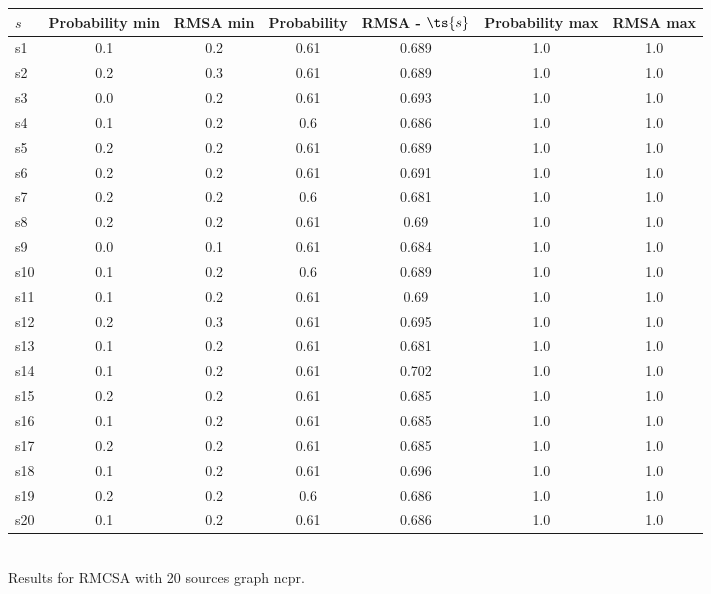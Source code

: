 \documentclass{article}
\begin{document}
\noindent\begin{tabular}{|l|c|c|c|c|c|c|}
\hline
$s$& Probability min & RMSA min & Probability & RMSA - $\ts{s}$ & Probability max & RMSA max\\
\hline
s1 &0.1 & 0.2 & 0.61 & 0.689 & 1.0 & 1.0\\
\hline
s2 &0.2 & 0.3 & 0.61 & 0.689 & 1.0 & 1.0\\
\hline
s3 &0.0 & 0.2 & 0.61 & 0.693 & 1.0 & 1.0\\
\hline
s4 &0.1 & 0.2 & 0.6 & 0.686 & 1.0 & 1.0\\
\hline
s5 &0.2 & 0.2 & 0.61 & 0.689 & 1.0 & 1.0\\
\hline
s6 &0.2 & 0.2 & 0.61 & 0.691 & 1.0 & 1.0\\
\hline
s7 &0.2 & 0.2 & 0.6 & 0.681 & 1.0 & 1.0\\
\hline
s8 &0.2 & 0.2 & 0.61 & 0.69 & 1.0 & 1.0\\
\hline
s9 &0.0 & 0.1 & 0.61 & 0.684 & 1.0 & 1.0\\
\hline
s10 &0.1 & 0.2 & 0.6 & 0.689 & 1.0 & 1.0\\
\hline
s11 &0.1 & 0.2 & 0.61 & 0.69 & 1.0 & 1.0\\
\hline
s12 &0.2 & 0.3 & 0.61 & 0.695 & 1.0 & 1.0\\
\hline
s13 &0.1 & 0.2 & 0.61 & 0.681 & 1.0 & 1.0\\
\hline
s14 &0.1 & 0.2 & 0.61 & 0.702 & 1.0 & 1.0\\
\hline
s15 &0.2 & 0.2 & 0.61 & 0.685 & 1.0 & 1.0\\
\hline
s16 &0.1 & 0.2 & 0.61 & 0.685 & 1.0 & 1.0\\
\hline
s17 &0.2 & 0.2 & 0.61 & 0.685 & 1.0 & 1.0\\
\hline
s18 &0.1 & 0.2 & 0.61 & 0.696 & 1.0 & 1.0\\
\hline
s19 &0.2 & 0.2 & 0.6 & 0.686 & 1.0 & 1.0\\
\hline
s20 &0.1 & 0.2 & 0.61 & 0.686 & 1.0 & 1.0\\
\hline
\end{tabular}\\

\noindent Results for RMCSA with 20 sources graph ncpr.
\end{document}
